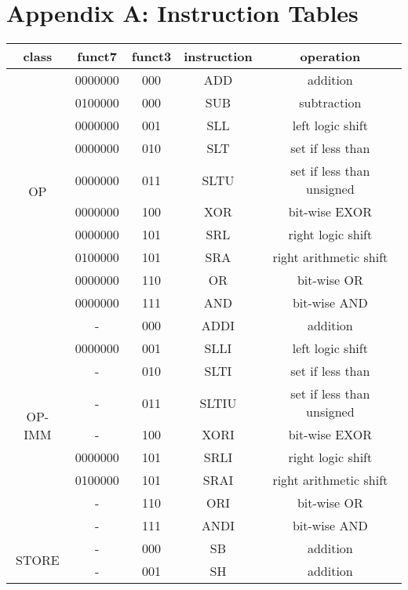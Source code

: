 \section{Appendix A: Instruction Tables}

\begin{table}[ht]
    \begin{center}
        \begin{tabular}{|c|c|c|c|c|}
            \hline
            class & funct7 & funct3 & instruction & operation \\
            \hline
            \multirow{10}{*}{OP} & 0000000 & 000 & ADD & addition\\
            & 0100000 & 000 & SUB & subtraction\\
            & 0000000 & 001 & SLL & left logic shift\\
            & 0000000 & 010 & SLT & set if less than\\
            & 0000000 & 011 & SLTU & set if less than unsigned\\
            & 0000000 & 100 & XOR & bit-wise EXOR\\
            & 0000000 & 101 & SRL & right logic shift\\
            & 0100000 & 101 & SRA & right arithmetic shift\\
            & 0000000 & 110 & OR & bit-wise OR\\
            & 0000000 & 111 & AND & bit-wise AND\\
            \hline
            \multirow{9}{*}{OP-IMM} & - & 000 & ADDI & addition\\
            & 0000000 & 001 & SLLI & left logic shift\\
            & - & 010 & SLTI & set if less than\\
            & - & 011 & SLTIU & set if less than unsigned\\
            & - & 100 & XORI & bit-wise EXOR\\
            & 0000000 & 101 & SRLI & right logic shift\\
            & 0100000 & 101 & SRAI & right arithmetic shift\\
            & - & 110 & ORI & bit-wise OR\\
            & - & 111 & ANDI & bit-wise AND\\
            \hline
            \multirow{3}{*}{STORE} & - & 000 & SB & addition\\
            & - & 001 & SH & addition\\

\end{tabular}
\end{center}
\end{table}
